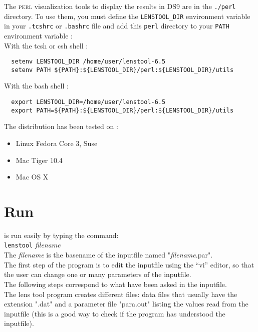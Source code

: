 The \textsc{perl} visualization tools to display the \lenstool results in  DS9
are in the \verb+./perl+ directory. To use them, you must define the
\verb+LENSTOOL_DIR+ environment variable in your \verb+.tcshrc+ or
\verb+.bashrc+ file and add this \verb+perl+ directory to your \verb+PATH+
environment variable : \\ With the tcsh or csh shell : 
\begin{verbatim}
  setenv LENSTOOL_DIR /home/user/lenstool-6.5
  setenv PATH ${PATH}:${LENSTOOL_DIR}/perl:${LENSTOOL_DIR}/utils
\end{verbatim}
With the bash shell :
\begin{verbatim}
  export LENSTOOL_DIR=/home/user/lenstool-6.5
  export PATH=${PATH}:${LENSTOOL_DIR}/perl:${LENSTOOL_DIR}/utils
\end{verbatim}

The distribution has been tested on :
\begin{itemize}
\item Linux Fedora Core 3, Suse
\item Mac Tiger 10.4
\item Mac OS X
\end{itemize}
\newpage
\section{Run}

\lenstool is run easily by typing the command:\\

\texttt{lenstool} \textit{filename}\\

The \textit{filename} is the basename of the inputfile named
"\textit{filename}.par". \\

The first step of the \lenstool program is to edit the inputfile using
the ``vi'' editor, so that the user can change one or many parameters of the 
inputfile.\\

The following steps correspond to what have been asked in the inputfile.\\

The lens tool program creates different files: data files that usually
have the extension ".dat" and a parameter file "para.out" listing the
values read from  the inputfile (this is a good way to check
if the program has understood the inputfile).


